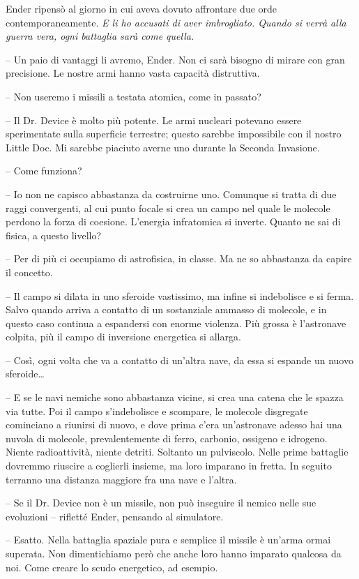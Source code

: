 {Ender ripensò al giorno in cui aveva dovuto affrontare due orde
	contemporaneamente. \emph{E li ho accusati di aver imbrogliato. Quando
		si verrà alla guerra vera, ogni battaglia sarà come quella.}}

{-- Un paio di vantaggi li avremo, Ender. Non ci sarà bisogno di mirare
	con gran precisione. Le nostre armi hanno vasta capacità distruttiva.}

{-- Non useremo i missili a testata atomica, come in passato?}

{-- Il Dr. Device è molto più potente. Le armi nucleari potevano essere
	sperimentate sulla superficie terrestre; questo sarebbe impossibile con
	il nostro Little Doc. Mi sarebbe piaciuto averne uno durante la Seconda
	Invasione.}

{-- Come funziona?}

{-- Io non ne capisco abbastanza da costruirne uno. Comunque si tratta
	di due raggi convergenti, al cui punto focale si crea un campo nel quale
	le molecole perdono la forza di coesione. L'energia infratomica si
	inverte. Quanto ne sai di fisica, a questo livello?}

{-- Per di più ci occupiamo di astrofisica, in classe. Ma ne so
	abbastanza da capire il concetto.}

{-- Il campo si dilata in uno sferoide vastissimo, ma infine si
	indebolisce e si ferma. Salvo quando arriva a contatto di un sostanziale
	ammasso di molecole, e in questo caso continua a espandersi con enorme
	violenza. Più grossa è l'astronave colpita, più il campo di inversione
	energetica si allarga.}

{-- Così, ogni volta che va a contatto di un'altra nave, da essa si
	espande un nuovo sferoide\ldots{}}

{-- E se le navi nemiche sono abbastanza vicine, si crea una catena che
	le spazza via tutte. Poi il campo s'indebolisce e scompare, le molecole
	disgregate cominciano a riunirsi di nuovo, e dove prima c'era
	un'astronave adesso hai una nuvola di molecole, prevalentemente di
	ferro, carbonio, ossigeno e idrogeno. Niente radioattività, niente
	detriti. Soltanto un pulviscolo. Nelle prime battaglie dovremmo riuscire
	a coglierli insieme, ma loro imparano in fretta. In seguito terranno una
	distanza maggiore fra una nave e l'altra.}

{-- Se il Dr. Device non è un missile, non può inseguire il nemico nelle
	sue evoluzioni -- rifletté Ender, pensando al simulatore.}

{-- Esatto. Nella battaglia spaziale pura e semplice il missile è
	un'arma ormai superata. Non dimentichiamo però che anche loro hanno
	imparato qualcosa da noi. Come creare lo scudo energetico, ad esempio.}

